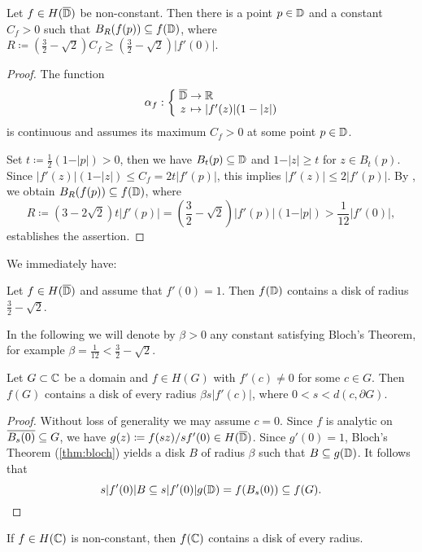 \begin{theorem} \label{thm:bloch-stronger}
    Let $f \in H(\overline{\mathbb{D}})$ be non-constant. Then there is a point $p \in \mathbb{D}$ and a constant $C_f > 0$ such that $B_{R}(f(p)) \subseteq f(\mathbb{D})$, where $R \coloneqq (\frac{3}{2} - \sqrt{2}) C_f \geq (\frac{3}{2} - \sqrt{2}) \vert f'(0) \vert$.
\end{theorem}

\begin{proof}
    The function
    $$ \mapping{\alpha_f}{\cl{\D} & \to & \R}{z & \mapsto & \vert f'(z) \vert (1 - \vert z \vert)} $$
    is continuous and assumes its maximum $C_f > 0$ at some point $p \in \mathbb{D}$.
    
    Set $t \coloneqq \frac{1}{2}(1 - \vert p \vert) > 0$, then we have $B_{t}(p) \subseteq \mathbb{D}$ and $1 - \vert z \vert \geq t$ for $z \in B_{t}(p)$. Since $\vert f'(z) \vert (1 - \vert z \vert) \leq C_f = 2 t \vert f'(p) \vert$, this implies $\vert f'(z) \vert \leq 2 \vert f'(p) \vert$. By , we obtain
    $ B_{R}(f(p)) \subseteq f(\mathbb{D}) $, where 
    $$ R \coloneqq (3 - 2 \sqrt{2}) t \vert f'(p) \vert = ({\textstyle \frac{3}{2}} - \sqrt{2}) \vert f'(p) \vert (1 - \vert p \vert) > {\textstyle \frac{1}{12}} \vert f'(0) \vert, $$
    establishes the assertion.
\end{proof}

We immediately have:    

\begin{theorem}[Bloch] \label{thm:bloch}
    Let $f \in H(\overline{\mathbb{D}})$ and assume that $f'(0) = 1$. Then $f(\mathbb{D})$ contains a disk of radius $\frac{3}{2} - \sqrt{2}$.
\end{theorem}

In the following we will denote by $\beta > 0$ any constant satisfying Bloch's Theorem, for example $\beta = \frac{1}{12} < \frac{3}{2} - \sqrt{2}$.

\begin{corollary} \label{cor:bloch-domain}
    Let $G \subset \mathbb{C}$ be a domain and $f \in H(G)$ with $f'(c) \neq 0$ for some $c \in G$. Then $f(G)$ contains a disk of every radius $\beta s \vert f'(c) \vert$, where $0 < s < d(c, \partial G)$.
\end{corollary}

\begin{proof}
    Without loss of generality we may assume $c = 0$. Since $f$ is analytic on $\overline{B_s(0)} \subseteq G$, we have $g(z) \coloneqq f(sz) / sf'(0) \in H(\overline{\mathbb{D}})$. Since $g'(0) = 1$, Bloch's Theorem (\ref{thm:bloch}) yields a disk $B$ of radius $\beta$ such that $B \subseteq g(\mathbb{D})$. It follows that
    \begin{equation*}
        s \vert f'(0) \vert B \subseteq s \vert f'(0) \vert g(\mathbb{D}) = f(B_s(0)) \subseteq f(G).
    \end{equation*}
\end{proof}

\begin{corollary} \label{cor:bloch-entire}
    If $f \in H(\mathbb{C})$ is non-constant, then $f(\mathbb{C})$ contains a disk of every radius.
\end{corollary}